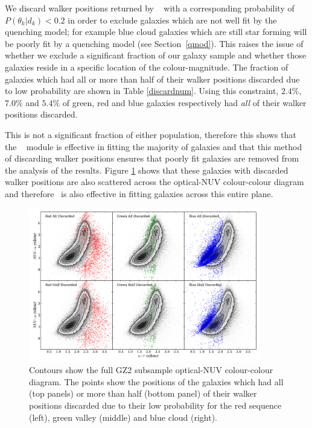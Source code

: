 We discard walker positions returned by \starpy~ with a corresponding probability of $P(\theta_k|d_k) < 0.2$ in order to exclude galaxies which are not well fit by the quenching model; for example blue cloud galaxies which are still star forming will be poorly fit by a quenching model (see Section~\ref{qmod}). This raises the issue of whether we exclude a significant fraction of our galaxy sample and whether those galaxies reside in a specific location of the colour-magnitude. The fraction of galaxies which had all or more than half of their walker positions discarded due to low probability are shown in Table \ref{discardnum}. Using this constraint, $2.4\%$, $7.0\%$ and $5.4\%$ of green, red and blue galaxies respectively had \emph{all} of their walker positions discarded. 

This is not a significant fraction of either population, therefore this shows that the \starpy~ module is effective in fitting the majority of galaxies and that this method of discarding walker positions ensures that poorly fit galaxies are removed from the analysis of the results. Figure \ref{discarded} shows that these galaxies with discarded walker positions are also scattered across the optical-NUV colour-colour diagram and therefore \starpy ~is also effective in fitting galaxies across this entire plane. 

\begin{figure}
\includegraphics[width=0.9\textwidth]{starpy/discarded_galaxy_colour_colour.pdf}
\caption[Colours of discarded galaxies]{Contours show the full GZ2 subsample optical-NUV colour-colour diagram. The points show the positions of the galaxies which had all (top panels) or more than half (bottom panel) of their walker positions discarded due to their low probability for the red sequence (left), green valley (middle) and blue cloud (right).}
\label{discarded}
\end{figure}



